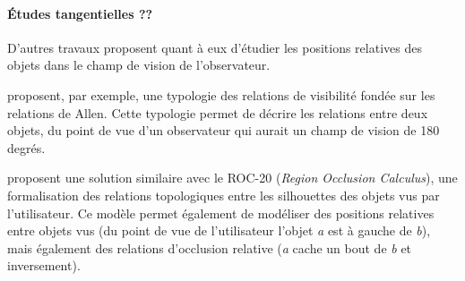 \paragraph{Études tangentielles ??}

D'autres travaux proposent quant à eux d'étudier les positions
relatives des objets dans le champ de vision de l'observateur.

\textcite{Santos2015} proposent, par exemple, une typologie des
relations de visibilité fondée sur les relations de Allen. Cette
typologie permet de décrire les relations entre deux objets, du point
de vue d'un observateur qui aurait un champ de vision de 180 degrés.

\textcite{Randell2001} proposent une solution similaire avec le ROC-20
(\emph{Region Occlusion Calculus}), une formalisation des relations
topologiques entre les silhouettes des objets vus par
l'utilisateur. Ce modèle permet également de modéliser des positions
relatives entre objets vus (\eg du point de vue de l'utilisateur
l'objet \emph{a} est à gauche de \emph{b}), mais également des
relations d'occlusion relative (\eg \emph{a} cache un bout de \emph{b}
et inversement).

